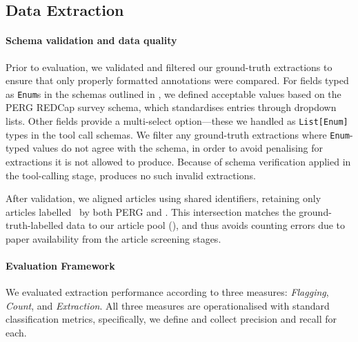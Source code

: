 \subsection{Data Extraction}\label{app:data_extraction_extended_methods}

\paragraph{Schema validation and data quality} Prior to evaluation, we validated and filtered our ground-truth extractions to ensure that only properly formatted annotations were compared. For fields typed as \texttt{Enum}s in the schemas outlined in , we defined acceptable values based on the PERG REDCap survey schema, which standardises entries through dropdown lists. Other fields provide a multi-select option—these we handled as \texttt{List[Enum]} types in the tool call schemas. We filter any ground-truth extractions where \texttt{Enum}-typed values do not agree with the schema, in order to avoid penalising \name{} for extractions it is not allowed to produce. Because of schema verification applied in the tool-calling stage, \name{} produces no such invalid extractions.

After validation, we aligned articles using shared identifiers, retaining only articles labelled \IN\ by both PERG and \name{}. This intersection matches the ground-truth-labelled data to our article pool (), and thus avoids counting errors due to paper availability from the article screening stages.

\paragraph{Evaluation Framework} We evaluated extraction performance according to three measures: \textit{Flagging}, \textit{Count}, and \textit{Extraction}. All three measures are operationalised with standard classification metrics, specifically, we define and collect precision and recall for each.


